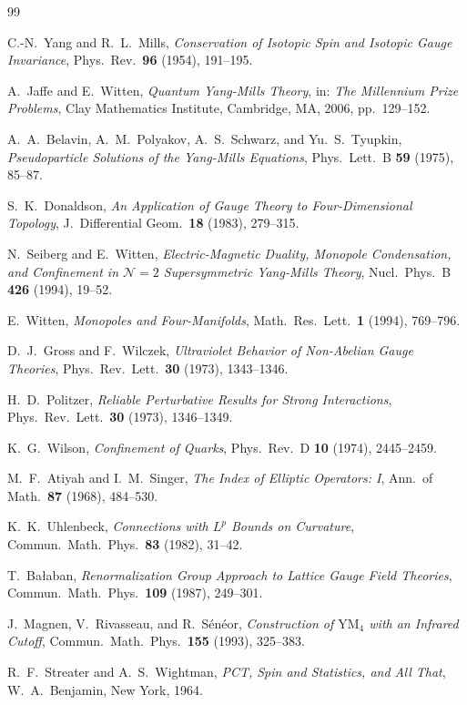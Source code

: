 \documentclass[12pt,a4paper]{amsart}
\theoremstyle{definition}
\theoremstyle{remark}
\begin{document}
\begin{thebibliography}{99}

C.-N.\ Yang and R.\ L.\ Mills,
\textit{Conservation of Isotopic Spin and Isotopic Gauge Invariance},
Phys.\ Rev.\ \textbf{96} (1954), 191--195.

A.\ Jaffe and E.\ Witten,
\textit{Quantum Yang-Mills Theory},
in: \textit{The Millennium Prize Problems},
Clay Mathematics Institute, Cambridge, MA, 2006, pp.\ 129--152.

A.\ A.\ Belavin, A.\ M.\ Polyakov, A.\ S.\ Schwarz, and Yu.\ S.\ Tyupkin,
\textit{Pseudoparticle Solutions of the Yang-Mills Equations},
Phys.\ Lett.\ B \textbf{59} (1975), 85--87.

S.\ K.\ Donaldson,
\textit{An Application of Gauge Theory to Four-Dimensional Topology},
J.\ Differential Geom.\ \textbf{18} (1983), 279--315.

N.\ Seiberg and E.\ Witten,
\textit{Electric-Magnetic Duality, Monopole Condensation, and Confinement in
$\mathcal{N}=2$ Supersymmetric Yang-Mills Theory},
Nucl.\ Phys.\ B \textbf{426} (1994), 19--52.

E.\ Witten,
\textit{Monopoles and Four-Manifolds},
Math.\ Res.\ Lett.\ \textbf{1} (1994), 769--796.

D.\ J.\ Gross and F.\ Wilczek,
\textit{Ultraviolet Behavior of Non-Abelian Gauge Theories},
Phys.\ Rev.\ Lett.\ \textbf{30} (1973), 1343--1346.

H.\ D.\ Politzer,
\textit{Reliable Perturbative Results for Strong Interactions},
Phys.\ Rev.\ Lett.\ \textbf{30} (1973), 1346--1349.

K.\ G.\ Wilson,
\textit{Confinement of Quarks},
Phys.\ Rev.\ D \textbf{10} (1974), 2445--2459.

M.\ F.\ Atiyah and I.\ M.\ Singer,
\textit{The Index of Elliptic Operators: I},
Ann.\ of Math.\ \textbf{87} (1968), 484--530.

K.\ K.\ Uhlenbeck,
\textit{Connections with $L^p$ Bounds on Curvature},
Commun.\ Math.\ Phys.\ \textbf{83} (1982), 31--42.

T.\ Bała{}ban,
\textit{Renormalization Group Approach to Lattice Gauge Field Theories},
Commun.\ Math.\ Phys.\ \textbf{109} (1987), 249--301.

J.\ Magnen, V.\ Rivasseau, and R.\ S\'en\'eor,
\textit{Construction of $\mathrm{YM}_4$ with an Infrared Cutoff},
Commun.\ Math.\ Phys.\ \textbf{155} (1993), 325--383.

R.\ F.\ Streater and A.\ S.\ Wightman,
\textit{PCT, Spin and Statistics, and All That},
W.\ A.\ Benjamin, New York, 1964.

\end{thebibliography}
\end{document}
